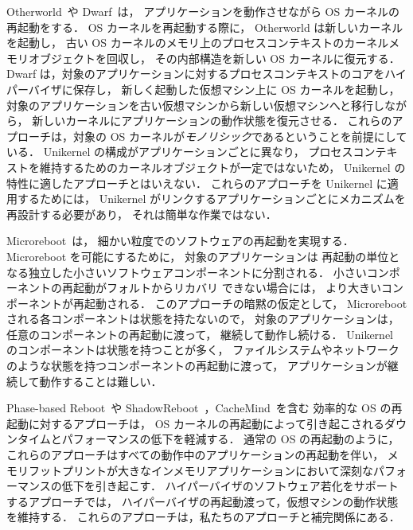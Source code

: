 Otherworld~\cite{DepoutovitchEtAl-otherworld}や Dwarf~\cite{TeradaEtAl-Dwarf}は，
アプリケーションを動作させながら OS カーネルの再起動をする．
OS カーネルを再起動する際に，
Otherworld は新しいカーネルを起動し，
古い OS カーネルのメモリ上のプロセスコンテキストのカーネルメモリオブジェクトを回収し，
その内部構造を新しい OS カーネルに復元する．
Dwarf は，対象のアプリケーションに対するプロセスコンテキストのコアをハイパーバイザに保存し，
新しく起動した仮想マシン上に OS カーネルを起動し，
対象のアプリケーションを古い仮想マシンから新しい仮想マシンへと移行しながら，
新しいカーネルにアプリケーションの動作状態を復元させる．
これらのアプローチは，対象の OS カーネルが\emph{モノリシック}であるということを前提にしている．
Unikernel の構成がアプリケーションごとに異なり，
プロセスコンテキストを維持するためのカーネルオブジェクトが一定ではないため，
Unikernel の特性に適したアプローチとはいえない．
これらのアプローチを Unikernel に適用するためには，
Unikernel がリンクするアプリケーションごとにメカニズムを再設計する必要があり，
それは簡単な作業ではない．

Microreboot~\cite{CandeaEtAl-Microreboot}は，
細かい粒度でのソフトウェアの再起動を実現する．
Microreboot を可能にするために，
対象のアプリケーションは
再起動の単位となる独立した小さいソフトウェアコンポーネントに分割される．
小さいコンポーネントの再起動がフォルトからリカバリ できない場合には，
より大きいコンポーネントが再起動される．
このアプローチの暗黙の仮定として，
Microreboot される各コンポーネントは状態を持たないので，
対象のアプリケーションは，任意のコンポーネントの再起動に渡って，
継続して動作し続ける．
Unikernel のコンポーネントは状態を持つことが多く，
ファイルシステムやネットワークのような状態を持つコンポーネントの再起動に渡って，
アプリケーションが継続して動作することは難しい．

Phase-based Reboot~\cite{YamakitaEtAl-PBR}や ShadowReboot~\cite{YamadaEtAl-ShadowR}，CacheMind~\cite{KouraiEtAl-cachemind}を含む
効率的な OS の再起動に対するアプローチは，
OS カーネルの再起動によって引き起こされるダウンタイムとパフォーマンスの低下を軽減する．
通常の OS の再起動のように，これらのアプローチはすべての動作中のアプリケーションの再起動を伴い，
メモリフットプリントが大きなインメモリアプリケーションにおいて深刻なパフォーマンスの低下を引き起こす．
ハイパーバイザのソフトウェア若化をサポートするアプローチでは，
ハイパーバイザの再起動渡って，仮想マシンの動作状態を維持する．
これらのアプローチは，私たちのアプローチと補完関係にある．

